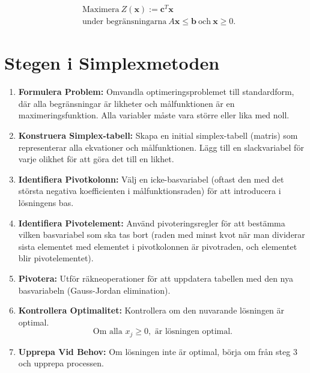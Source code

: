 \documentclass{article}
\begin{document}

\begin{align*}
&\text{Maximera} \ Z(\bm{x}) := \bm{c}^T\bm{x} \\
&\text{under begränsningarna} \ A\bm{x} \le \bm{b} \ \text{och} \ \bm{x} \ge 0.
\end{align*}



\section*{Stegen i Simplexmetoden}
\begin{enumerate}
    \item \textbf{Formulera Problem:} Omvandla optimeringsproblemet till standardform, där alla begränsningar är likheter och målfunktionen är en maximeringsfunktion. Alla variabler måste vara större eller lika med noll.
    
    \item \textbf{Konstruera Simplex-tabell:} Skapa en initial simplex-tabell (matris) som representerar alla ekvationer och målfunktionen. Lägg till en slackvariabel för varje olikhet för att göra det till en likhet.
    
    \item \textbf{Identifiera Pivotkolonn:} Välj en icke-basvariabel (oftast den med det största negativa koefficienten i målfunktionsraden) för att introducera i lösningens bas.
    
    \item \textbf{Identifiera Pivotelement:} Använd pivoteringsregler för att bestämma vilken basvariabel som ska tas bort (raden med minst kvot när man dividerar sista elementet med elementet i pivotkolonnen är pivotraden, och elementet blir pivotelementet).
    
    \item \textbf{Pivotera:} Utför räkneoperationer för att uppdatera tabellen med den nya basvariabeln (Gauss-Jordan elimination).
    
    \item \textbf{Kontrollera Optimalitet:} Kontrollera om den nuvarande lösningen är optimal.
    \[
    \text{Om alla } x_j \geq 0, \text{ är lösningen optimal.}
    \]
    
    \item \textbf{Upprepa Vid Behov:} Om lösningen inte är optimal, börja om från steg 3 och upprepa processen.
\end{enumerate}
\end{document}
